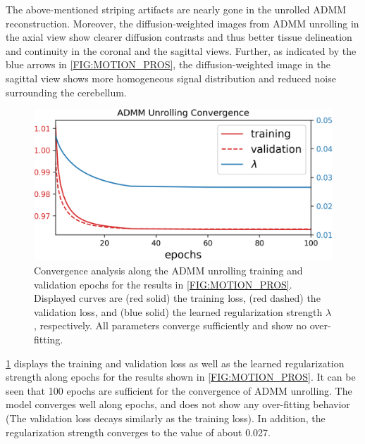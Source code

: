 \documentclass[AMA,STIX2COL,Linenumberson]{MRM}
\begin{document}
The above-mentioned striping artifacts are nearly gone
in the unrolled ADMM reconstruction.
Moreover, the diffusion-weighted images from ADMM unrolling in the axial view
show clearer diffusion contrasts
and thus better tissue delineation and continuity
in the coronal and the sagittal views.
Further, as indicated by the blue arrows in \cref{FIG:MOTION_PROS},
the diffusion-weighted image in the sagittal view shows more homogeneous
signal distribution and reduced noise surrounding the cerebellum.

\begin{figure}
	\centering
	\includegraphics[width=\columnwidth]{./figures/fig7.png}
	\caption{Convergence analysis along the ADMM unrolling training
		and validation epochs
		for the results in \cref{FIG:MOTION_PROS}.
		Displayed curves are (red solid) the training loss,
		(red dashed) the validation loss,
		and (blue solid) the learned regularization strength $\lambda$, respectively.
		All parameters converge sufficiently and show no over-fitting.}
	\label{FIG:CONVERGENCE}
\end{figure}

\cref{FIG:CONVERGENCE} displays the training and validation loss
as well as the learned regularization strength along epochs
for the results shown in \cref{FIG:MOTION_PROS}.
It can be seen that 100 epochs are sufficient for
the convergence of ADMM unrolling.
The model converges well along epochs,
and does not show any over-fitting behavior
(The validation loss decays similarly as the training loss).
In addition, the regularization strength converges
to the value of about 0.027.
\end{document}
